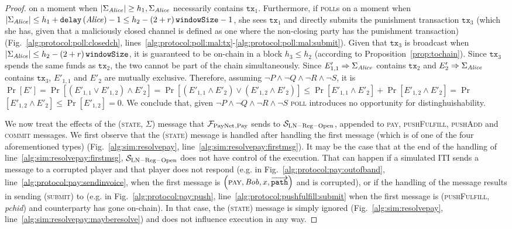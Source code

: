 \begin{proof}
  on a moment when $|\Sigma_{\mathit{Alice}}| \geq h_1, \Sigma_{\mathit{Alice}}$ necessarily
  contains $\mathtt{tx}_1$. Furthermore, if \alice{} \textsc{poll}s on a moment
  when $|\Sigma_{\mathit{Alice}}| \leq h_1 + \mathtt{delay}\left(\mathit{Alice}\right) - 1 \leq
  h_2 - \left(2 + r\right)\texttt{windowSize}{} - 1$, she sees $\mathtt{tx}_1$ and directly submits the
  punishment transaction $\mathtt{tx}_3$ (which she has, given that a
  maliciously closed channel is defined as one where the non-closing party has
  the punishment transaction) (Fig.~\ref{alg:protocol:poll:closedch},
  lines~\ref{alg:protocol:poll:mal:tx}-\ref{alg:protocol:poll:mal:submit}).
  Given that $\mathtt{tx}_3$ is broadcast when $|\Sigma_{\mathit{Alice}}| \leq h_2 -
  \left(2 + r\right)\texttt{windowSize}{}$, it is guaranteed to be on-chain in a block $h_3 \leq h_2$
  (according to Proposition~\ref{prop:tochain}). Since $\mathtt{tx}_3$ spends
  the same funds as $\mathtt{tx}_2$, the two cannot be part of the chain
  simultaneously. Since $E'_{1,1} \Rightarrow \Sigma_{\mathit{Alice}}$ contains
  $\mathtt{tx}_2$ and $E'_2 \Rightarrow \Sigma_{\mathit{Alice}}$ contains
  $\mathtt{tx}_3$, $E'_{1,1}$ and $E'_2$ are mutually exclusive. Therefore,
  assuming $\neg P \wedge \neg Q \wedge \neg R \wedge \neg S$, it is
  $\Pr\left[E'\right] = \Pr\left[\left(E'_{1,1} \vee E'_{1,2}\right) \wedge
  E'_2\right] = \Pr\left[\left(E'_{1,1} \wedge E'_2\right) \vee \left(E'_{1,2}
  \wedge E'_2\right)\right] \leq \Pr\left[E'_{1,1} \wedge E'_2\right] +
  \Pr\left[E'_{1,2} \wedge E'_2\right] = \Pr$ $\left[ E'_{1,2} \wedge
  E'_2\right] \leq \Pr\left[E'_{1,2}\right] = 0$. We conclude that, given $\neg
  P \wedge \neg Q \wedge \neg R \wedge \neg S$ \textsc{poll} introduces no
  opportunity for distinghuishability.

  We now treat the effects of the (\textsc{state}, $\Sigma$) message that
  $\mathcal{F}_{\mathrm{PayNet}}{}_{\mathrm{, Pay}}$ sends to $\mathcal{S}_{\mathrm{LN - Reg -
  Open}}$, appended to \textsc{pay}, \textsc{pushFulfill}, \textsc{pushAdd} and
  \textsc{commit} messages. We first observe that the (\textsc{state}) message
  is handled after handling the first message (which is of one of the four
  aforementioned types) (Fig.~\ref{alg:sim:resolvepay},
  line~\ref{alg:sim:resolvepay:firstmsg}). It may be the case that at the end of
  the handling of line~\ref{alg:sim:resolvepay:firstmsg},
  $\mathcal{S}_{\mathrm{LN - Reg - Open}}$ does not have control of the
  execution. That can happen if a simulated ITI sends a message to a corrupted
  player and that player does not respond (e.g. in
  Fig.~\ref{alg:protocol:pay:outofband},
  line~\ref{alg:protocol:pay:sendinvoice}, when the first message is
  $\left(\textsc{pay}, \mathit{Bob}, x, \overrightarrow{\mathtt{path}}\right)$ and
  \bob{} is corrupted), or if the handling of the message results in sending
  (\textsc{submit}) to \ledger{} (e.g. in Fig.~\ref{alg:protocol:pay:push},
  line~\ref{alg:protocol:pushfulfill:submit} when the first message is
  (\textsc{pushFulfill}, \textit{pchid}) and counterparty has gone on-chain). In
  that case, the (\textsc{state}) message is simply ignored
  (Fig.~\ref{alg:sim:resolvepay}, line~\ref{alg:sim:resolvepay:mayberesolve})
  and does not influence execution in any way.


\end{proof}
